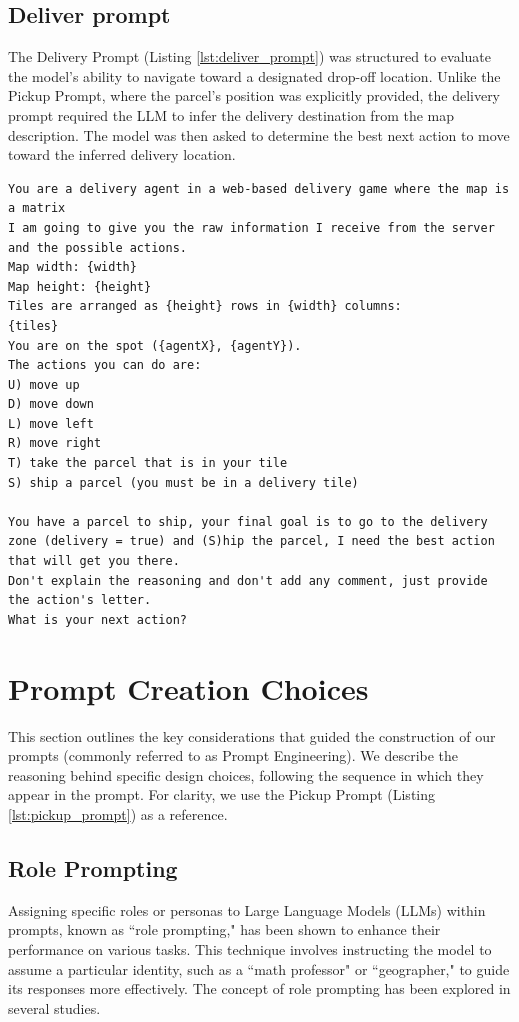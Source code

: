 \subsection{Deliver prompt}
\label{sub:deliver_prompt}

The Delivery Prompt (Listing \ref{lst:deliver_prompt}) was structured to
evaluate the model's ability to navigate toward a designated drop-off location. Unlike
the Pickup Prompt, where the parcel's position was explicitly provided, the delivery
prompt required the LLM to infer the delivery destination from the map description.
The model was then asked to determine the best next action to move toward the
inferred delivery location.

\begin{codewindow}
  [Text]  \begin{lstlisting}
You are a delivery agent in a web-based delivery game where the map is a matrix
I am going to give you the raw information I receive from the server and the possible actions.
Map width: {width}
Map height: {height}
Tiles are arranged as {height} rows in {width} columns:
{tiles}
You are on the spot ({agentX}, {agentY}).
The actions you can do are:
U) move up
D) move down
L) move left
R) move right
T) take the parcel that is in your tile
S) ship a parcel (you must be in a delivery tile)

You have a parcel to ship, your final goal is to go to the delivery zone (delivery = true) and (S)hip the parcel, I need the best action that will get you there.
Don't explain the reasoning and don't add any comment, just provide the action's letter.
What is your next action?
\end{lstlisting}
\end{codewindow}

\section{Prompt Creation Choices}
\label{sec:prompt_creation_choices}

This section outlines the key considerations that guided the construction of our
prompts (commonly referred to as Prompt Engineering). We describe the reasoning behind
specific design choices, following the sequence in which they appear in the
prompt. For clarity, we use the Pickup Prompt (Listing \ref{lst:pickup_prompt})
as a reference.

\subsection{Role Prompting}
Assigning specific roles or personas to Large Language Models (LLMs) within
prompts, known as ``role prompting," has been shown to enhance their performance
on various tasks. This technique involves instructing the model to assume a
particular identity, such as a ``math professor" or ``geographer," to guide its
responses more effectively. The concept of role prompting has been explored in several
studies.

